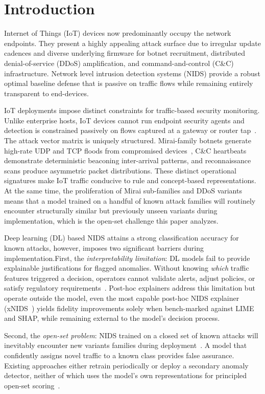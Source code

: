 \documentclass[journal]{IEEEtran}
\begin{document}
\section{Introduction}

Internet of Things (IoT) devices now predominantly occupy the network endpoints. They present a highly appealing attack surface due to irregular update cadences and diverse underlying firmware for botnet recruitment, distributed denial-of-service (DDoS) amplification, and command-and-control (C\&C) infrastructure. Network level intrusion detection systems (NIDS) provide a robust optimal baseline defense that is passive on traffic flows while remaining entirely transparent to end-devices.

IoT deployments impose distinct constraints for traffic-based security monitoring. Unlike enterprise hosts, IoT devices cannot run endpoint security agents and detection is constrained passively on flows captured at a gateway or router tap~\cite{mirsky2018kitsune}. The attack vector matrix is uniquely structured. Mirai-family botnets generate high-rate UDP and TCP floods from compromised devices~\cite{meidan2018nbaiot}, C\&C heartbeats demonstrate deterministic beaconing inter-arrival patterns, and reconnaissance scans produce asymmetric packet distributions. These distinct operational signatures make IoT traffic conducive to rule and concept-based representations. At the same time, the proliferation of Mirai sub-families and DDoS variants means that a model trained on a handful of known attack families will routinely encounter structurally
similar but previously unseen variants during implementation, which is the open-set challenge this paper analyzes.

Deep learning (DL) based NIDS attains a strong classification accuracy for known attacks, however, imposes two significant barriers during implementation.First, the \emph{interpretability limitation}: DL models fail to provide explainable justifications for flagged anomalies.  Without knowing \emph{which} traffic features triggered a decision, operators cannot validate alerts, adjust policies, or satisfy regulatory requirements~\cite{rudin2019stop,arp2022dos}. Post-hoc explainers address this limitation but operate outside the model, even the most capable post-hoc NIDS explainer (xNIDS~\cite{wei2023xnids}) yields fidelity improvements solely when bench-marked against LIME and SHAP, while remaining external to the model's decision process.

Second, the \emph{open-set problem}: NIDS trained on a closed set of known attacks will inevitably encounter new variants families during deployment~\cite{arp2022dos}. A model that confidently assigns novel traffic to a known class provides false assurance. Existing approaches either retrain periodically or deploy a secondary anomaly detector, neither of which uses the model's own representations for principled open-set scoring~\cite{han2023owad}.
\end{document}
